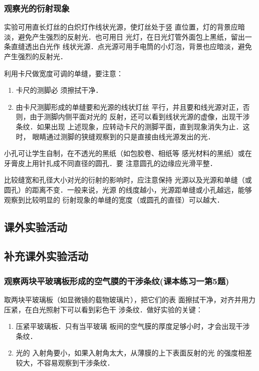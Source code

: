 \subsubsection{观察光的衍射现象}
实验可用直长灯丝的白炽灯作线状光源，使灯丝处于竖
直位置，灯的背景应暗淡，避免产生强烈的反射光．也可用日
光灯，在日光灯管外面包上黑纸，留出一条直缝透出白光作
线状光源．点光源可用手电筒的小灯泡，背景也应暗淡，避免
产生强烈的反射光．

利用卡尺做宽度可调的单缝，要注意：
\begin{enumerate}
\item 卡尺的测脚必
须擦拭干净．
\item 由卡尺测脚形成的单缝要和光源的线状灯丝
平行，并且要和线光源对正，否则，由于测脚内侧平面对光的
反射，还可以看到线状光源的虚像，出现干涉条纹．如果出现
上述现象，应转动卡尺的测脚平面，直到现象消失为止．这时，
眼睛通过测脚的狭缝观察到的只是直接由线光源发出的光．
\end{enumerate}

小孔可让学生自制，在不透光的黑纸（如包胶卷、相纸等
感光材料的黑纸）或在牙膏皮上用针扎成不同直径的圆孔．要
注意圆孔的边缘应光滑平整．

比较缝宽和孔径大小对光的衍射的影响时，应注意保持
光源以及光源和单缝（或圆孔）的距离不变．一般来说，光源
的线度越小，光源距单缝或小孔越远，能够观察到比较明显的
衍射现象的单缝的宽度（或圆孔的直径）可以越大．

\subsection{课外实验活动}
\subsection*{补充课外实验活动}

\subsubsection{观察两块平玻璃板形成的空气膜的干涉条纹(课本练习一第5题)}

取两块平玻璃板（如显微镜的载物玻璃片），把它们的表
面擦拭干净，对齐并用力压紧，在白光照射下可以看到彩色干
涉条纹．做好实验的关键：
\begin{enumerate}
\item 压紧平玻璃板．只有当平玻璃
板间的空气膜的厚度足够小时，才会出现干涉条纹．   
\item 光的
入射角要小，如果入射角太大，从薄膜的上下表面反射的光
的强度相差较大，不容易观察到干涉条纹．
\end{enumerate}

